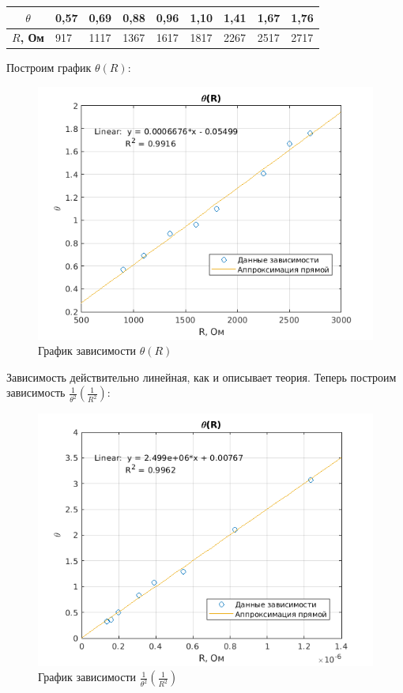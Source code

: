 \begin{table}[h!]
    \centering
    \begin{tabular}{|c|l|l|l|l|l|l|l|l|}
    \hline
    \textbf{$\theta$} & 0,57 & 0,69 & 0,88 & 0,96 & 1,10 & 1,41 & 1,67 & 1,76 \\ \hline
    \textbf{$R$, Ом}  & 917  & 1117 & 1367 & 1617 & 1817 & 2267 & 2517 & 2717 \\ \hline
    \end{tabular}
\end{table}

Построим график $\theta (R)$:

\begin{figure}[h!]
    \centering
    \includegraphics[width = 12 cm]{images/exp2.png}
    \caption{График зависимости $\theta (R)$}
    \label{exp2}
\end{figure}

Зависимость действительно линейная, как и описывает теория. Теперь построим зависимость $\frac{1}{\theta^2}(\frac{1}{R^2})$:

\begin{figure}[h!]
    \centering
    \includegraphics[width = 12 cm]{images/exp3.png}
    \caption{График зависимости $\frac{1}{\theta^2}(\frac{1}{R^2})$}
    \label{exp3}
\end{figure}


